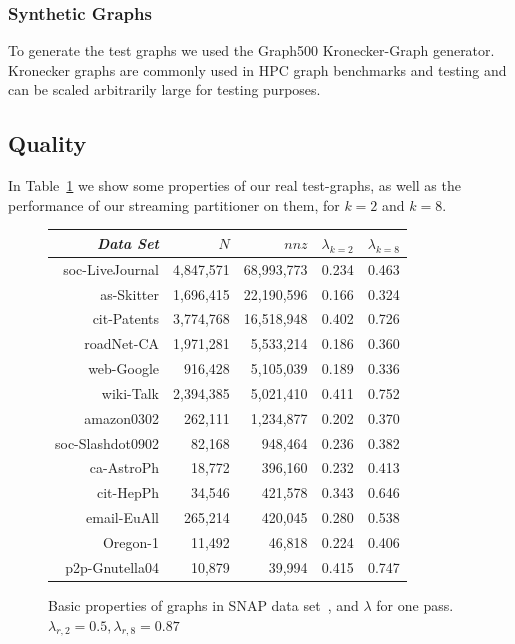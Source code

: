 
\subsubsection{Synthetic Graphs}
To generate the test graphs we used the Graph500 Kronecker-Graph generator.
Kronecker graphs are commonly used in HPC graph benchmarks and testing and can be scaled arbitrarily large for testing purposes. 



\subsection{Quality}
In Table~\ref{table:big} we show some properties of our real test-graphs, as well as the performance of our streaming partitioner on them, for $k=2$ and $k=8$.


\begin{figure}
\caption{Basic properties of graphs in SNAP data set~\cite{Leskovec-data}, and $\lambda$ for one pass. $\lambda_{r,2}=0.5,\lambda_{r,8}=0.87$}
\centering
\small
{ \begin{tabular}{ *5r }    \toprule
\label{table:big}
\emph{Data Set} & $N$ & $nnz$  & $\lambda_{k=2}$ & $\lambda_{k=8}$ \\\midrule
soc-LiveJournal & 4,847,571 & 68,993,773  &0.234& 0.463\\
as-Skitter & 1,696,415 & 22,190,596  & 0.166&0.324\\
cit-Patents & 3,774,768 & 16,518,948  & 0.402&0.726\\
roadNet-CA & 1,971,281 & 5,533,214  & 0.186&0.360\\
web-Google & 916,428 & 5,105,039  &0.189&0.336\\
wiki-Talk & 2,394,385 & 5,021,410 &0.411&0.752\\
amazon0302 & 262,111 & 1,234,877 & 0.202&0.370\\
soc-Slashdot0902 & 82,168 & 948,464  &0.236&0.382\\
ca-AstroPh & 18,772 & 396,160 & 0.232&0.413\\
cit-HepPh & 34,546 & 421,578 & 0.343&0.646\\
email-EuAll & 265,214 & 420,045 & 0.280&0.538\\
Oregon-1 & 11,492 & 46,818  & 0.224&0.406\\
p2p-Gnutella04 & 10,879 & 39,994  & 0.415&0.747\\


 \hline
\end{tabular}\par
}
\end{figure}


